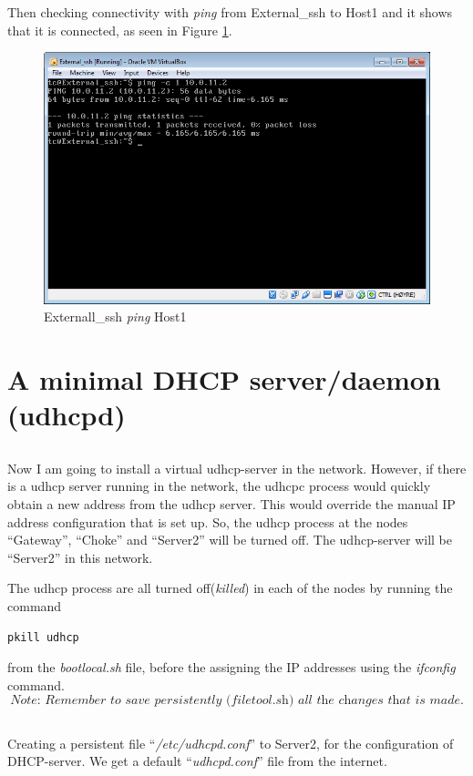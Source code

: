 \documentclass[12pt,a4paper,final]{IEEtran}
\begin{document}
Then checking connectivity with \textit{ping} from External\_ssh to Host1 and it shows that it is connected, as seen in Figure \ref{tab:2c_xs_ping}.
\begin{figure}[!h]
\includegraphics[width=1.0\textwidth]{2c_3.png}
\caption{Externall\_ssh \textit{ping} Host1 }
\label{tab:2c_xs_ping} 
\end{figure} 

\section{A minimal DHCP server/daemon (udhcpd)}

\subsection{}
Now I am going to install a virtual udhcp-server in the network. However, if there is a udhcp server running in the network, the udhcpc process would quickly obtain a new address from the udhcp server. This would override the manual IP address configuration that is set up. So, the udhcp process at the nodes ``Gateway'', ``Choke'' and ``Server2'' will be turned off. The udhcp-server will be ``Server2'' in this network.

The udhcp process are all turned off(\textit{killed}) in each of the nodes by running the command
\begin{verbatim}
pkill udhcp
\end{verbatim}
from the \textit{bootlocal.sh} file, before the assigning the IP addresses using the \textit{ifconfig} command. \\
\[\textit{Note: Remember to save persistently (filetool.sh) all the changes that is made.}\]


\subsection{}
Creating a persistent file ``\textit{/etc/udhcpd.conf}'' to Server2, for the configuration of DHCP-server. We get a default ``\textit{udhcpd.conf}'' file from the internet.


 
\end{document}
